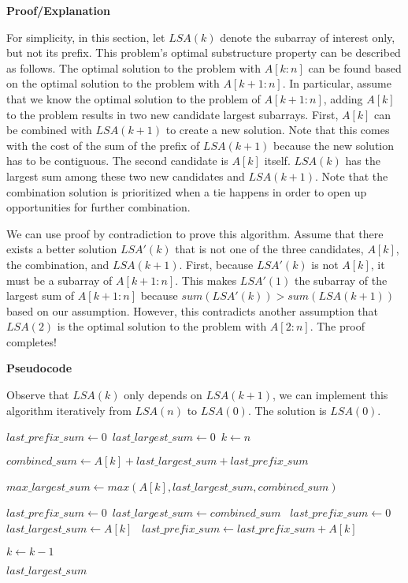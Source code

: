 \documentclass[12pt,article]{article}
\begin{document}
\textbf{Proof/Explanation}

For simplicity, in this section, let $LSA(k)$ denote the subarray of interest only, but not its prefix. This problem's optimal substructure property can be described as follows. The optimal solution to the problem with $A[k:n]$ can be found based on the optimal solution to the problem with $A[k+1:n]$. In particular, assume that we know the optimal solution to the problem of $A[k+1:n]$, adding $A[k]$ to the problem results in two new candidate largest subarrays. First, $A[k]$ can be combined with $LSA(k+1)$ to create a new solution. Note that this comes with the cost of the sum of the prefix of $LSA(k+1)$ because the new solution has to be contiguous. The second candidate is $A[k]$ itself. $LSA(k)$ has the largest sum among these two new candidates and $LSA(k+1)$. Note that the combination solution is prioritized when a tie happens in order to open up opportunities for further combination.

We can use proof by contradiction to prove this algorithm. Assume that there exists a better solution $LSA'(k)$ that is not one of the three candidates, $A[k]$, the combination, and $LSA(k+1)$. First, because $LSA'(k)$ is not $A[k]$, it must be a subarray of $A[k+1:n]$. This makes $LSA'(1)$ the subarray of the largest sum of $A[k+1:n]$ because $sum(LSA'(k)) > sum(LSA(k+1))$ based on our assumption. However, this contradicts another assumption that $LSA(2)$ is the optimal solution to the problem with $A[2:n]$. The proof completes!

\newpage
\textbf{Pseudocode}

Observe that $LSA(k)$ only depends on $LSA(k+1)$, we can implement this algorithm iteratively from $LSA(n)$ to $LSA(0)$. The solution is $LSA(0)$.


\begin{algorithm}
\caption{$LSA(A[1:n])$}\label{alg:LSA}
\begin{algorithmic}
    \State $last\_prefix\_sum \gets 0$\
    \State $last\_largest\_sum \gets 0$\
    \State $k \gets n$\;
    
        \State $combined\_sum \gets A[k] + last\_largest\_sum + last\_prefix\_sum$

        \State $max\_largest\_sum \gets max(A[k], last\_largest\_sum, combined\_sum)$\

        \If{$combined\_sum == max\_largest\_sum$}
            \State $last\_prefix\_sum \gets 0$\
            \State $last\_largest\_sum \gets combined\_sum$\
            \State $last\_prefix\_sum \gets 0$\
            \State $last\_largest\_sum \gets A[k]$\
            \State $last\_prefix\_sum \gets last\_prefix\_sum + A[k]$\
        \EndIf

        \State $k \gets k - 1$
    \EndWhile

    \Return $last\_largest\_sum$
\end{algorithmic}
\end{algorithm}
\end{document}
